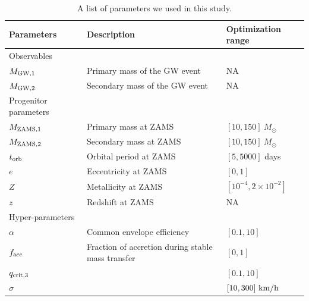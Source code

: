 \documentclass[twocolumn]{aastex631}
\begin{document}
\begin{table}[hbt!]
    \begin{center}
    \begin{tabular}{ l l l }
    \hline
    \hline
    Parameters &  Description & Optimization range\\
    \hline
    \hline
    Observables &\ &\  \\
    \hline
    \hline
    $M_{\rm GW,1}$ & Primary mass of the GW event & NA \\
    $M_{\rm GW,2}$ & Secondary mass of the GW event  & NA\\
    \hline
    \hline
    Progenitor parameters &\ &\  \\
    \hline
    \hline
    $M_{\rm ZAMS,1}$ & Primary mass at ZAMS & $[10,150]\ M_{\odot}$\\
    $M_{\rm ZAMS,2}$ & Secondary mass at ZAMS & $[10,150]\ M_{\odot}$\\
    $t_{\rm orb}$ & Orbital period at ZAMS & $[5,5000]$ days\\
    $e$ & Eccentricity at ZAMS & $[0,1]$\\
    $Z$ & Metallicity at ZAMS & $[10^{-4},2\times10^{-2}]$\\
    $z$ & Redshift at ZAMS & NA\\
    \hline
    \hline
    Hyper-parameters &\ &\ \\
    \hline
    \hline
    
    $\alpha$ & Common envelope efficiency & $[0.1,10]$\\
    $f_{\rm acc}$ & Fraction of accretion during stable mass transfer & $[0,1]$\\
    $q_{\rm crit,3}$ & & $[0.1,10]$\\
    $\sigma$ & & $[10,300]\ {\rm km/h}$\\


    \hline
    \hline
    \end{tabular}
    \caption{A list of parameters we used in this study.}
    \label{tab:parameters}
    \end{center}
\end{table}
    
\end{document}
